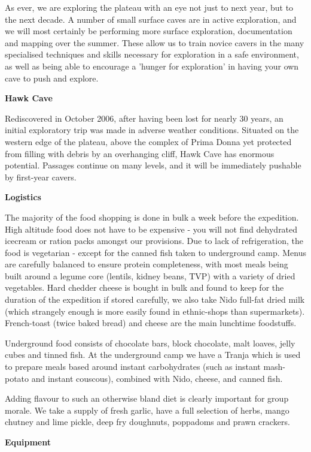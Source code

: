 As ever, we are exploring the plateau with an eye not just to next year, but to the next decade. A number of small surface caves are in active exploration, and we will most certainly be performing more surface exploration, documentation and mapping over the summer. These allow us to train novice cavers in the many specialised techniques and skills necessary for exploration in a safe environment, as well as being able to encourage a 'hunger for exploration' in having your own cave to push and explore.

\textbf{Hawk Cave}

Rediscovered in October 2006, after having been lost for nearly 30 years, an initial exploratory trip was made in adverse weather conditions. Situated on the western edge of the plateau, above the complex of Prima Donna yet protected from filling with debris by an overhanging cliff, Hawk Cave has enormous potential. Passages continue on many levels, and it will be immediately pushable by first-year cavers.


\textbf{Logistics}

The majority of the food shopping is done in bulk a week before the expedition. High altitude food does not have to be expensive - you will not find dehydrated icecream or ration packs amongst our provisions. Due to lack of refrigeration, the food is vegetarian - except for the canned fish taken to underground camp. Menus are carefully balanced to ensure protein completeness, with most meals being built around a legume core (lentils, kidney beans, TVP) with a variety of dried vegetables. Hard chedder cheese is bought in bulk and found to keep for the duration of the expedition if stored carefully, we also take Nido full-fat dried milk (which strangely enough is more easily found in ethnic-shops than supermarkets). French-toast (twice baked bread) and cheese are the main lunchtime foodstuffs.

Underground food consists of chocolate bars, block chocolate, malt loaves, jelly cubes and tinned fish. At the underground camp we have a Tranja which is used to prepare meals based around instant carbohydrates (such as instant mash-potato and instant couscous), combined with Nido, cheese, and canned fish.

Adding flavour to such an otherwise bland diet is clearly important for group morale. We take a supply of fresh garlic, have a full selection of herbs, mango chutney and lime pickle, deep fry doughnuts, poppadoms and prawn crackers.


\textbf{Equipment}

